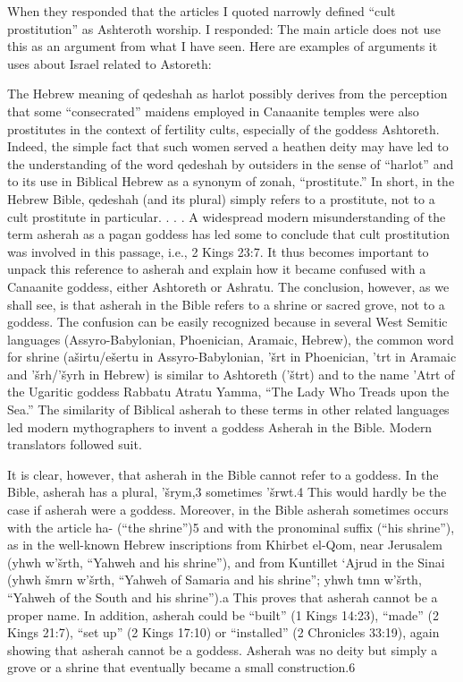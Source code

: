 \documentclass[11pt]{article}
\begin{document}
When they responded that the articles I quoted narrowly defined “cult prostitution” as Ashteroth worship. I responded: The main article does not use this as an argument from what I have seen. Here are examples of arguments it uses about Israel related to Astoreth:

The Hebrew meaning of qedeshah as harlot possibly derives from the perception that some “consecrated” maidens employed in Canaanite temples were also prostitutes in the context of fertility cults, especially of the goddess Ashtoreth. Indeed, the simple fact that such women served a heathen deity may have led to the understanding of the word qedeshah by outsiders in the sense of “harlot” and to its use in Biblical Hebrew as a synonym of zonah, “prostitute.” In short, in the Hebrew Bible, qedeshah (and its plural) simply refers to a prostitute, not to a cult prostitute in particular.
. . . 
A widespread modern misunderstanding of the term asherah as a pagan goddess has led some to conclude that cult prostitution was involved in this passage, i.e., 2 Kings 23:7. It thus becomes important to unpack this reference to asherah and explain how it became confused with a Canaanite goddess, either Ashtoreth or Ashratu. The conclusion, however, as we shall see, is that asherah in the Bible refers to a shrine or sacred grove, not to a goddess.
The confusion can be easily recognized because in several West Semitic languages (Assyro-Babylonian, Phoenician, Aramaic, Hebrew), the common word for shrine (aširtu/ešertu in Assyro-Babylonian, ’šrt in Phoenician, ’trt in Aramaic and ’šrh/’šyrh in Hebrew) is similar to Ashtoreth (’štrt) and to the name ’Atrt of the Ugaritic goddess Rabbatu Atratu Yamma, “The Lady Who Treads upon the Sea.” The similarity of Biblical asherah to these terms in other related languages led modern mythographers to invent a goddess Asherah in the Bible. Modern translators followed suit.

It is clear, however, that asherah in the Bible cannot refer to a goddess. In the Bible, asherah has a plural, ’šrym,3 sometimes ’šrwt.4 This would hardly be the case if asherah were a goddess. Moreover, in the Bible asherah sometimes occurs with the article ha- (“the shrine”)5 and with the pronominal suffix (“his shrine”), as in the well-known Hebrew inscriptions from Khirbet el-Qom, near Jerusalem (yhwh w’šrth, “Yahweh and his shrine”), and from Kuntillet ‘Ajrud in the Sinai (yhwh šmrn w’šrth, “Yahweh of Samaria and his shrine”; yhwh tmn w’šrth, “Yahweh of the South and his shrine”).a This proves that asherah cannot be a proper name. In addition, asherah could be “built” (1 Kings 14:23), “made” (2 Kings 21:7), “set up” (2 Kings 17:10) or “installed” (2 Chronicles 33:19), again showing that asherah cannot be a goddess. Asherah was no deity but simply a grove or a shrine that eventually became a small construction.6
\end{document}
